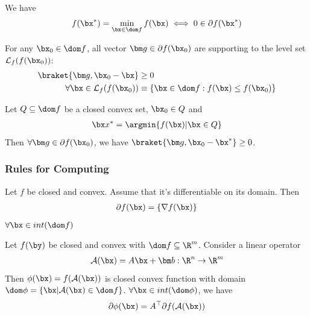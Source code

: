 \begin{theorem}
    We have 
    \begin{align*}
        f(\bx^*)=\min_{\bx\in\dom f}f(\bx)\iff 0\in \partial f(\bx^*)
    \end{align*}
\end{theorem}

\begin{theorem}
    For any $\bx_0\in\dom f$, all vector $\bm g\in\partial f(\bx_0)$ are supporting to the level set $\mathcal{L}_f(f(\bx_0))$:
    \begin{align*}
        \braket{\bm g, \bx_0-\bx}&\ge 0\\
        \forall \bx\in \mathcal{L}_f(f(\bx_0))&\equiv \{ \bx\in\dom f:f(\bx)\le f(\bx_0) \}
    \end{align*}
\end{theorem}

\begin{corollary}
    Let $Q\subseteq \dom f$ be a closed convex set, $\bx_0\in Q$ and 
    \begin{align*}
        \bx x^*=\argmin \{ f(\bx)|\bx\in Q \}
    \end{align*}
    Then $\forall \bm g \in \partial f(\bx_0)$, we have $\braket{\bm g, \bx_0-\bx^*}\ge 0$. 
\end{corollary}

\subsubsection{Rules for Computing}
\begin{lemma}
    Let $f$ be closed and convex. Assume that it's differentiable on its domain. Then
    \begin{align*}
        \partial f(\bx)=\left\{ \nabla f(\bx) \right\}
    \end{align*}
    $\forall \bx\in int(\dom f)$
\end{lemma}

\begin{lemma}
    Let $f(\by)$ be closed and convex with $\dom f\subseteq \R^m$. Consider a linear operator 
    \begin{align*}
        \mathcal{A}(\bx)=A\bx+\bm b: \R^n\to \R^m
    \end{align*}
    Then $\phi(\bx)=f(\mathcal{A}(\bx))$ is closed convex function with domain $\dom \phi=\{ \bx|\mathcal{A}(\bx)\in \dom f \}$. $\forall \bx\in int(\dom \phi)$, we have
    \begin{align*}
        \partial \phi(\bx)=A^{\top} \partial f(\mathcal{A}(\bx))
    \end{align*}
\end{lemma}

